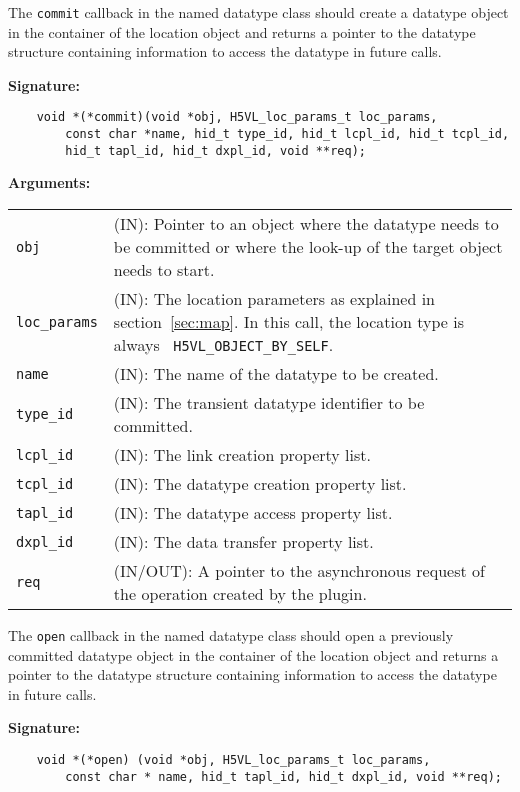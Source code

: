 The {\tt commit} callback in the named datatype class should create a datatype object in the container of the location object and
returns a pointer to the datatype structure containing information to
access the datatype in future calls. 

\textbf{Signature:}
\begin{lstlisting}
    void *(*commit)(void *obj, H5VL_loc_params_t loc_params, 
        const char *name, hid_t type_id, hid_t lcpl_id, hid_t tcpl_id, 
        hid_t tapl_id, hid_t dxpl_id, void **req);
\end{lstlisting}

\textbf{Arguments:}\\
\begin{tabular}{l p{10cm}}
  {\tt obj} & (IN): Pointer to an object where the datatype needs
  to be committed or where the look-up of the target object needs to
  start.\\
  {\tt loc\_params} & (IN): The location parameters as explained in
  section~\ref{sec:map}. In this call, the location type is always {\tt
    H5VL\_OBJECT\_BY\_SELF}. \\
  {\tt name} & (IN): The name of the datatype to be created.\\
  {\tt type\_id} & (IN): The transient datatype identifier to be
  committed. \\
  {\tt lcpl\_id} & (IN): The link creation property list. \\
  {\tt tcpl\_id} & (IN): The datatype creation property list.\\
  {\tt tapl\_id} & (IN): The datatype access property list.\\
  {\tt dxpl\_id} & (IN): The data transfer property list.\\
  {\tt req} & (IN/OUT): A pointer to the asynchronous request of the
  operation created by the plugin.\\
\end{tabular}

The {\tt open} callback in the named datatype class should open a
previously committed datatype object in the container of the location
object and returns a pointer to the datatype structure containing
information to access the datatype in future calls.

\textbf{Signature:}
\begin{lstlisting}
    void *(*open) (void *obj, H5VL_loc_params_t loc_params, 
        const char * name, hid_t tapl_id, hid_t dxpl_id, void **req);
\end{lstlisting}

